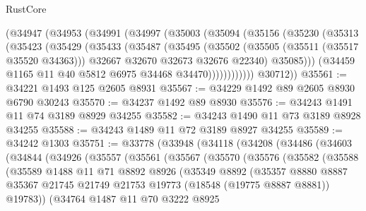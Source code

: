 \begin{lexlean}{RustCore}
\begin{coremodule}
        (@34947
          (@34953
            (@34991
              (@34997
                (@35003
                  (@35094
                    (@35156
                      (@35230
                        (@35313
                          (@35423
                            (@35429
                              (@35433
                                (@35487
                                  (@35495
                                    (@35502
                                      (@35505 (@35511 (@35517 @35520 @34363)))
                                      @32667
                                      @32670
                                      @32673
                                      @32676
                                      @22340)
                                    @35085)))
                              (@34459 @1165 @11 @40 @5812 @6975 @34468 @34470))))))))))))
        @30712))
@35561 := @34221 @1493 @125 @2605 @8931
@35567 := @34229 @1492 @89 @2605 @8930 @6790 @30243
@35570 := @34237 @1492 @89 @8930
@35576 := @34243 @1491 @11 @74 @3189 @8929 @34255
@35582 := @34243 @1490 @11 @73 @3189 @8928 @34255
@35588 := @34243 @1489 @11 @72 @3189 @8927 @34255
@35589 := @34242 @1303
@35751 := @33778
    (@33948
      (@34118
        (@34208
          (@34486
            (@34603
              (@34844
                (@34926
                  (@35557
                    (@35561
                      (@35567
                        (@35570
                          (@35576
                            (@35582
                              (@35588
                                (@35589
                                  @1488
                                  @11
                                  @71
                                  @8892
                                  @8926
                                  (@35349
                                    @8892
                                    (@35357
                                      @8880
                                      @8887
                                      @35367
                                      @21745
                                      @21749
                                      @21753
                                      @19773
                                      (@18548 (@19775 @8887 @8881))
                                      @19783))
                                  (@34764
                                    @1487
                                    @11
                                    @70
                                    @3222
                                    @8925

\end{coremodule}
\end{lexlean}
